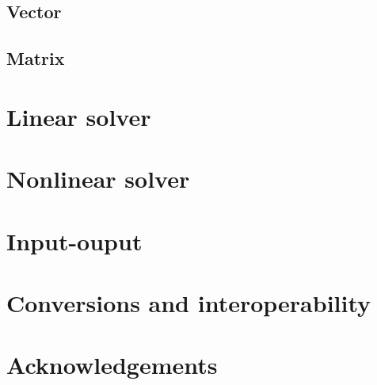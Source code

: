 \documentclass[a4paper,landscape,columns=3]{cheatsheet} %
\begin{document}
\subsection{Vector}
\subsection{Matrix}


\section{Linear solver}


\section{Nonlinear solver}

\section{Input-ouput}


\section{Conversions and interoperability}


\section{Acknowledgements}
\cite{utopiagit}



\end{document}
